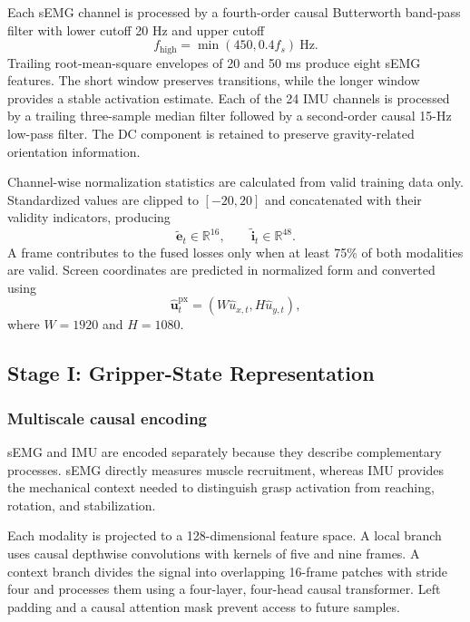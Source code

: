 Each sEMG channel is processed by a fourth-order causal Butterworth band-pass
filter with lower cutoff 20 Hz and upper cutoff
\begin{equation}
    f_{\mathrm{high}}=\min(450,0.4f_s)\ \mathrm{Hz}.
\end{equation}
Trailing root-mean-square envelopes of 20 and 50 ms produce eight sEMG
features. The short window preserves transitions, while the longer window
provides a stable activation estimate. Each of the 24 IMU channels is processed
by a trailing three-sample median filter followed by a second-order causal
15-Hz low-pass filter. The DC component is retained to preserve gravity-related
orientation information.

Channel-wise normalization statistics are calculated from valid training data
only. Standardized values are clipped to $[-20,20]$ and concatenated with their
validity indicators, producing
\begin{equation}
    \tilde{\mathbf e}_t\in\mathbb{R}^{16},\qquad
    \tilde{\mathbf i}_t\in\mathbb{R}^{48}.
\end{equation}
A frame contributes to the fused losses only when at least 75\% of both
modalities are valid. Screen coordinates are predicted in normalized form and
converted using
\begin{equation}
    \hat{\mathbf u}^{\mathrm{px}}_t
    =(W\hat u_{x,t},H\hat u_{y,t}),
\end{equation}
where $W=1920$ and $H=1080$.

\subsection{Stage I: Gripper-State Representation}

\subsubsection{Multiscale causal encoding}

sEMG and IMU are encoded separately because they describe complementary
processes. sEMG directly measures muscle recruitment, whereas IMU provides the
mechanical context needed to distinguish grasp activation from reaching,
rotation, and stabilization.

Each modality is projected to a 128-dimensional feature space. A local branch
uses causal depthwise convolutions with kernels of five and nine frames. A
context branch divides the signal into overlapping 16-frame patches with
stride four and processes them using a four-layer, four-head causal
transformer. Left padding and a causal attention mask prevent access to future
samples.

